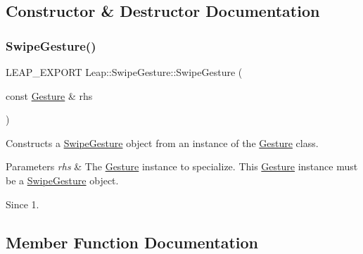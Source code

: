 \subsection{Constructor \& Destructor Documentation}
\mbox{\label{class_leap_1_1_swipe_gesture_ac4698d7bf0a8ef15a92b00866a31fb7f}} 
\subsubsection{\texorpdfstring{Swipe\+Gesture()}{SwipeGesture()}}
{\footnotesize\ttfamily L\+E\+A\+P\+\_\+\+E\+X\+P\+O\+RT Leap\+::\+Swipe\+Gesture\+::\+Swipe\+Gesture (\begin{DoxyParamCaption}\item[{const \hyperlink{class_leap_1_1_gesture}{Gesture} \&}]{rhs }\end{DoxyParamCaption})}

Constructs a \hyperlink{class_leap_1_1_swipe_gesture}{Swipe\+Gesture} object from an instance of the \hyperlink{class_leap_1_1_gesture}{Gesture} class.


\begin{DoxyCodeInclude}
\end{DoxyCodeInclude}



\begin{DoxyParams}{Parameters}
{\em rhs} & The \hyperlink{class_leap_1_1_gesture}{Gesture} instance to specialize. This \hyperlink{class_leap_1_1_gesture}{Gesture} instance must be a \hyperlink{class_leap_1_1_swipe_gesture}{Swipe\+Gesture} object. \\
\hline
\end{DoxyParams}
\begin{DoxySince}{Since}
1. 
\end{DoxySince}


\subsection{Member Function Documentation}
\mbox{\label{class_leap_1_1_swipe_gesture_a0dac022eaf599cf5393af9456cb9896e}} 

